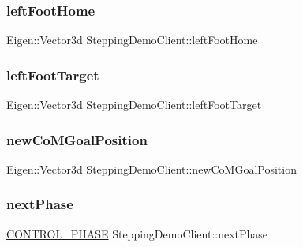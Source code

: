 \subsubsection{\texorpdfstring{left\+Foot\+Home}{leftFootHome}}
{\footnotesize\ttfamily Eigen\+::\+Vector3d Stepping\+Demo\+Client\+::left\+Foot\+Home\hspace{0.3cm}{\ttfamily [private]}}

\hypertarget{classSteppingDemoClient_a2360933e2902d1b1a374787bd67e14e7}{}\label{classSteppingDemoClient_a2360933e2902d1b1a374787bd67e14e7} 
\subsubsection{\texorpdfstring{left\+Foot\+Target}{leftFootTarget}}
{\footnotesize\ttfamily Eigen\+::\+Vector3d Stepping\+Demo\+Client\+::left\+Foot\+Target\hspace{0.3cm}{\ttfamily [private]}}

\hypertarget{classSteppingDemoClient_ab4a77111abbf3630280a64d17ac59eef}{}\label{classSteppingDemoClient_ab4a77111abbf3630280a64d17ac59eef} 
\subsubsection{\texorpdfstring{new\+Co\+M\+Goal\+Position}{newCoMGoalPosition}}
{\footnotesize\ttfamily Eigen\+::\+Vector3d Stepping\+Demo\+Client\+::new\+Co\+M\+Goal\+Position\hspace{0.3cm}{\ttfamily [private]}}

\hypertarget{classSteppingDemoClient_ab5a3b82049a9786162a60d0ae94f96d9}{}\label{classSteppingDemoClient_ab5a3b82049a9786162a60d0ae94f96d9} 
\subsubsection{\texorpdfstring{next\+Phase}{nextPhase}}
{\footnotesize\ttfamily \hyperlink{SteppingDemoClient_8h_af2a8507bf21c3ce9b0e67a23381251c6}{C\+O\+N\+T\+R\+O\+L\+\_\+\+P\+H\+A\+SE} Stepping\+Demo\+Client\+::next\+Phase\hspace{0.3cm}{\ttfamily [private]}}

